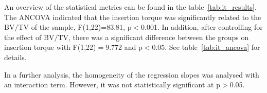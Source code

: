 \documentclass[12pt, a4paper, twoside]{report}
\begin{document}
%
\begin{table}[H]
\centering
{}
\caption{Results from the ANCOVA analysis, controlling for BV/TV.}
\label{tab:it_ancova}
\end{table}
%
An overview of the statistical metrics can be found in the table~\ref{tab:it_results}.
The ANCOVA indicated that the insertion torque was significantly related to the BV$/$TV of the sample, F(1,22)=83.81, p$<$0.001.
In addition, after controlling for the effect of BV$/$TV, there was a significant difference between the groups on insertion torque with F(1,22)$=$9.772 and p$<$0.05.
See table~\ref{tab:it_ancova} for details.

In a further analysis, the homogeneity of the regression slopes was analysed with an interaction term.
However, it was not statistically significant at p$>$0.05.

%
%
%
\end{document}
